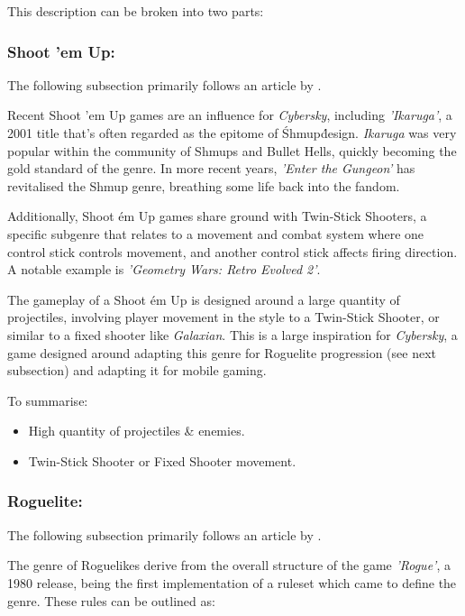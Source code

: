 \documentclass{scrartcl}
\let\cite\textcite
\begin{document}
This description can be broken into two parts:

\subsubsection{Shoot 'em Up:}

The following subsection primarily follows an article by \cite{BrianW2020-01}.

Recent Shoot 'em Up games are an influence for \emph{Cybersky}, including \emph{'Ikaruga'}, a 2001 title that's often regarded as the epitome of \'Shmup\' design. \emph{Ikaruga} was very popular within the community of Shmups and Bullet Hells, quickly becoming the gold standard of the genre. In more recent years, \emph{'Enter the Gungeon'} has revitalised the Shmup genre, breathing some life back into the fandom.

Additionally, Shoot \'em Up games share ground with Twin-Stick Shooters, a specific subgenre that relates to a movement and combat system where one control stick controls movement, and another control stick affects firing direction. A notable example is \emph{'Geometry Wars: Retro Evolved 2'}.

The gameplay of a Shoot \'em Up is designed around a large quantity of projectiles, involving player movement in the style to a Twin-Stick Shooter, or similar to a fixed shooter like \emph{Galaxian}. This is a large inspiration for \emph{Cybersky}, a game designed around adapting this genre for Roguelite progression (see next subsection) and adapting it for mobile gaming.

To summarise:

\begin{itemize}
  \item High quantity of projectiles \& enemies.
  \item Twin-Stick Shooter or Fixed Shooter movement.
\end{itemize}

\subsubsection{Roguelite:}

The following subsection primarily follows an article by \cite{BrianW2020-02}.

The genre of Roguelikes derive from the overall structure of the game \emph{'Rogue'}, a 1980 release, being the first implementation of a ruleset which came to define the genre. These rules can be outlined as:
\end{document}
